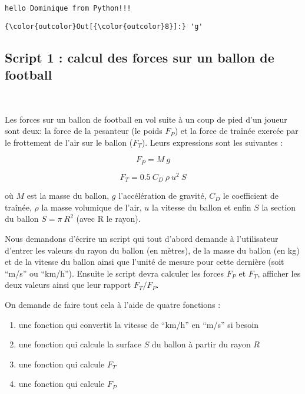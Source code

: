 \documentclass{article}
\begin{document}
    \begin{Verbatim}[commandchars=\\\{\}]
hello Dominique from Python!!!
    \end{Verbatim}

            \begin{Verbatim}[commandchars=\\\{\}]
{\color{outcolor}Out[{\color{outcolor}8}]:} 'g'
\end{Verbatim}
        
    \subsection{Script 1 : calcul des forces sur un ballon de
football}\label{script-1-calcul-des-forces-sur-un-ballon-de-football}

    \begin{center}
    \end{center}
    { \hspace*{\fill} \\}
    

    Les forces sur un ballon de football en vol suite à un coup de pied d'un
joueur sont deux: la force de la pesanteur (le poids \(F_P\)) et la
force de traînée exercée par le frottement de l'air sur le ballon
(\(F_T\)). Leurs expressions sont les suivantes :

    \[F_P = M\ g\]

\[F_T = 0.5 \ C_D \ \rho \ u^2\ S \]

    où \(M\) est la masse du ballon, \(g\) l'accélération de gravité,
\(C_D\) le coefficient de traînée, \(\rho\) la masse volumique de l'air,
\(u\) la vitesse du ballon et enfin \(S\) la section du ballon
\(S=\pi\ R^2\) (avec R le rayon).

    Nous demandons d'écrire un script qui tout d'abord demande à
l'utilisateur d'entrer les valeurs du rayon du ballon (en mètres), de la
masse du ballon (en kg) et de la vitesse du ballon ainsi que l'unité de
mesure pour cette dernière (soit ``m/s'' ou ``km/h''). Ensuite le script
devra calculer les forces \(F_P\) et \(F_T\), afficher les deux valeurs
ainsi que leur rapport \(F_T/F_P\).

    On demande de faire tout cela à l'aide de quatre fonctions :

\begin{enumerate}
\def\labelenumi{\arabic{enumi})}
\item
  une fonction qui convertit la vitesse de ``km/h'' en ``m/s'' si besoin
\item
  une fonction qui calcule la surface \(S\) du ballon à partir du rayon
  \(R\)
\item
  une fonction qui calcule \(F_T\)
\item
  une fonction qui calcule \(F_P\)
\end{enumerate}
\end{document}
